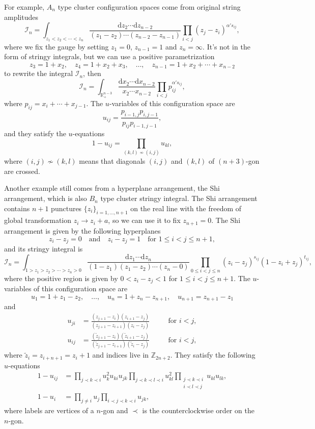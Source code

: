 \documentclass[hidelinks,12pt]{article}
\begin{document}
For example, $A_n$ type cluster configuration spaces come from original string 
amplitudes
\[
	\mathcal I_n = \int_{z_1<z_2<\cdots <z_n}
	\frac{\mathrm dz_2\cdots \mathrm dz_{n-2}}{(z_1-z_2)\cdots (z_{n-2}-z_{n-1})}
	\prod_{i<j} (z_j-z_i)^{\alpha' s_{ij}},
\]
where we fix the gauge by setting $z_1=0$, $z_{n-1}=1$ and $z_n=\infty$.
It's not in the form of stringy integrals, but we can use a positive
parametrization 
\[
z_3=1+x_2,\quad z_4=1+x_2+x_3,\quad \dots, \quad 
z_{n-1}=1+x_2+\cdots+x_{n-2}
\]
to rewrite the integral $\mathcal I_n$, then
\[
    \mathcal I_n=\int_{\mathbb R_+^{n-3}}
	\frac{\mathrm dx_2\cdots \mathrm dx_{n-2}}{x_2\cdots x_{n-2}}
	\prod_{i<j} p_{ij}^{\alpha' s_{ij}},
\]
where $p_{ij}=x_i+\cdots+x_{j-1}$. The $u$-variables of this configuration space are
\[
	u_{ij}=\frac{p_{i-1,j}p_{i,j-1}}{p_{ij}p_{i-1,j-1}},
\]
and they satisfy the $u$-equations
\[
	1-u_{ij}=\prod_{(k,l)\not\sim (i,j)}u_{kl},
\]
where $(i,j)\not\sim (k,l)$ means that diagonals $(i,j)$ and $(k,l)$ of
$(n+3)$-gon are crossed.

Another example still comes from a hyperplane arrangement, the Shi arrangement,
which is also $B_n$ type cluster stringy integral.
The Shi arrangement contains $n+1$ punctures $\{z_i\}_{i=1,\dots,n+1}$ 
on the real line with the freedom of global transformation 
$z_i\to z_i+a$, so we can use it to fix $z_{n+1}=0$. The Shi arrangement is 
given by the following hyperplanes
\[
	z_i-z_j=0\quad \text{and}\quad z_i-z_j=1\quad \text{for $1\leq i<j\leq n+1$},
\]
and its stringy integral is 
\[
\mathcal I_n = \int_{1>z_1>z_2>\cdots >z_n>0}
\frac{\mathrm dz_1\cdots \mathrm dz_{n}}{(1-z_1)(z_1-z_2)\cdots (z_{n}-0)}
\prod_{0\leq i<j \leq n}(z_i-z_j)^{s_{ij}}(1-z_i+z_j)^{t_{ij}},
\]
where the positive region is given by $0<z_i-z_j<1$ for $1\leq i<j \leq n+1$.
The $u$-variables of this configuration space are
\[
    u_1=1+z_1-z_2,\quad \dots,\quad u_{n}=1+z_{n}-z_{n+1},\quad u_{n+1}=z_{n+1}-z_1
\]
and 
\[
\begin{aligned}
    u_{ji}&=\frac{(z_{j+1}-z_{i})(z_{i+1}-z_j)}{(z_{j+1}-z_{i+1})(z_i-z_j)}\quad &&\text{for $i<j$},\\
    u_{ij}&=\frac{(\tilde z_{j+1}-z_{i})(\tilde z_{i+1}-z_j)}{(\tilde z_{j+1}-z_{i+1})(\tilde z_i-z_j)}\quad &&\text{for $i<j$},
\end{aligned}
\]
where $\tilde{z}_i=z_{i+n+1}=z_{i}+1$ and indices live in $\mathbb Z_{2n+2}$.
They satisfy the following $u$-equations 
\begin{align*}	
1-u_{ij}&=\prod\limits_{j\prec k \prec i}u_k^2 u_{ki}u_{jk}\!\!\prod\limits_{j\prec k\prec l\prec i}u_{kl}^2\!\!\prod\limits_{\substack{j\prec k\prec i\\i\prec l\prec j}}u_{kl}u_{lk},\\
1-u_{i}&=\prod\limits_{j\neq i}u_j \prod_{i\prec j\prec k\prec i}u_{jk},
\end{align*}
where labels are vertices of a $n$-gon and $\prec$ is the counterclockwise order on
the $n$-gon.
\end{document}
